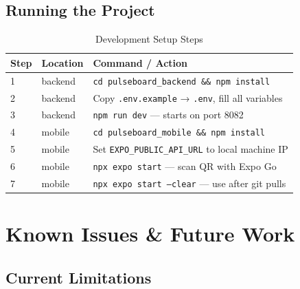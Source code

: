 \documentclass[12pt,a4paper]{report}
\begin{document}
\section{Running the Project}

\begin{table}[H]
\centering
{}
\begin{tabularx}{\textwidth}{l l X}
\rowcolor{tableheadbg}
\color{white}Step & \color{white}Location & \color{white}Command / Action \\
\toprule
1 & backend  & \texttt{cd pulseboard\_backend \&\& npm install} \\
2 & backend  & Copy \texttt{.env.example} → \texttt{.env}, fill all variables \\
3 & backend  & \texttt{npm run dev} — starts on port 8082 \\
4 & mobile   & \texttt{cd pulseboard\_mobile \&\& npm install} \\
5 & mobile   & Set \texttt{EXPO\_PUBLIC\_API\_URL} to local machine IP \\
6 & mobile   & \texttt{npx expo start} — scan QR with Expo Go \\
7 & mobile   & \texttt{npx expo start --clear} — use after git pulls \\
\bottomrule
\end{tabularx}
\caption{Development Setup Steps}
\end{table}

\chapter{Known Issues \& Future Work}

\section{Current Limitations}
\end{document}
